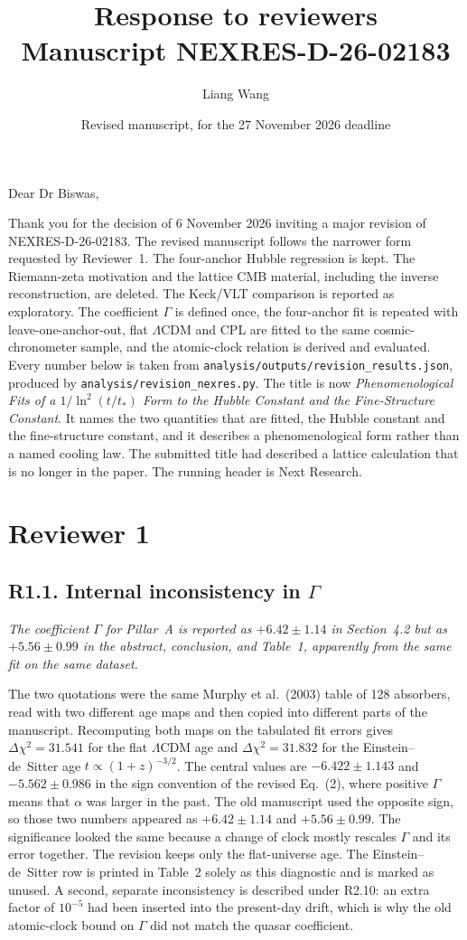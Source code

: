 \documentclass[11pt]{article}
\title{Response to reviewers\\
\large Manuscript NEXRES-D-26-02183}
\author{Liang Wang}
\date{Revised manuscript, for the 27 November 2026 deadline}
\begin{document}
\maketitle

\noindent
Dear Dr Biswas,

Thank you for the decision of 6 November 2026 inviting a major revision of NEXRES-D-26-02183.
The revised manuscript follows the narrower form requested by Reviewer~1.
The four-anchor Hubble regression is kept.
The Riemann-zeta motivation and the lattice CMB material, including the inverse reconstruction, are deleted.
The Keck/VLT comparison is reported as exploratory.
The coefficient $\Gamma$ is defined once, the four-anchor fit is repeated with leave-one-anchor-out, flat $\Lambda$CDM and CPL are fitted to the same cosmic-chronometer sample, and the atomic-clock relation is derived and evaluated.
Every number below is taken from \texttt{analysis/outputs/revision\_results.json}, produced by \texttt{analysis/revision\_nexres.py}.
The title is now \emph{Phenomenological Fits of a $1/\ln^{2}(t/t_{*})$ Form to the Hubble Constant and the Fine-Structure Constant}.
It names the two quantities that are fitted, the Hubble constant and the fine-structure constant, and it describes a phenomenological form rather than a named cooling law.
The submitted title had described a lattice calculation that is no longer in the paper.
The running header is Next Research.

\section*{Reviewer 1}

\subsection*{R1.1. Internal inconsistency in $\Gamma$}

\textit{The coefficient $\Gamma$ for Pillar~A is reported as $+6.42\pm1.14$ in Section~4.2 but as $+5.56\pm0.99$ in the abstract, conclusion, and Table~1, apparently from the same fit on the same dataset.}

The two quotations were the same Murphy et al.\ (2003) table of 128 absorbers, read with two different age maps and then copied into different parts of the manuscript.
Recomputing both maps on the tabulated fit errors gives $\Delta\chi^{2}=31.541$ for the flat $\Lambda$CDM age and $\Delta\chi^{2}=31.832$ for the Einstein--de~Sitter age $t\propto(1+z)^{-3/2}$.
The central values are $-6.422\pm1.143$ and $-5.562\pm0.986$ in the sign convention of the revised Eq.~(2), where positive $\Gamma$ means that $\alpha$ was larger in the past.
The old manuscript used the opposite sign, so those two numbers appeared as $+6.42\pm1.14$ and $+5.56\pm0.99$.
The significance looked the same because a change of clock mostly rescales $\Gamma$ and its error together.
The revision keeps only the flat-universe age.
The Einstein--de~Sitter row is printed in Table~2 solely as this diagnostic and is marked as unused.
A second, separate inconsistency is described under R2.10: an extra factor of $10^{-5}$ had been inserted into the present-day drift, which is why the old atomic-clock bound on $\Gamma$ did not match the quasar coefficient.
\end{document}
